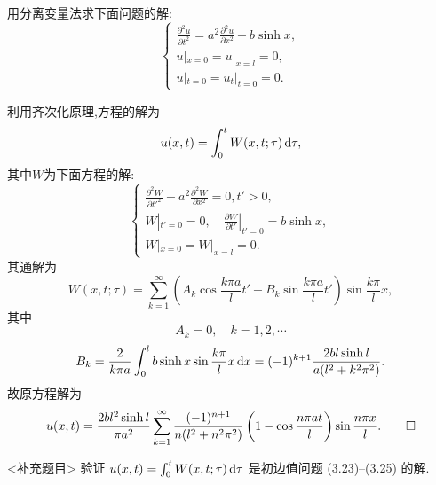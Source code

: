 \begin{exercise}
  用分离变量法求下面问题的解:
  \[\begin{cases}
    \frac{\partial^2u}{\partial t^2} = a^2 \frac{\partial^2u}{\partial x^2} + b\sinh x, \\
    u|_{x=0} = u|_{x=l} = 0, \\
    u|_{t=0} = u_t|_{t=0} = 0.
  \end{cases}\]
\end{exercise}

\begin{solve}
  利用齐次化原理,方程的解为
  \[u(x,t)=\int_0^tW(x,t;\tau)\mathop{}\!\mathrm{d}\tau,\]
  其中$W$为下面方程的解:
  \[\begin{cases}
    \frac{\partial^2W}{\partial t'^2}-a^2\frac{\partial^2W}{\partial x^2}=0,t'>0, \\
    W|_{t'=0} = 0,\quad\frac{\partial W}{\partial t'}|_{t'=0} = b\sinh x, \\
    W|_{x=0} = W|_{x=l} = 0.
  \end{cases}\]
  其通解为
  \[W(x,t;\tau) = \sum_{k=1}^{\infty}\left(A_k\cos\frac{k\pi a}{l}t'
    + B_k\sin\frac{k\pi a}{l}t'\right)\sin\frac{k\pi}{l}x,\]
  其中
  \[A_k = 0,\quad k=1,2,\cdots\]
  \[B_k = \frac{2}{k\pi a}\int_0^l b\sinh x\sin\frac{k\pi}{l}x\mathop{}\!\mathrm{d} x
    = (-1)^{k+1}\frac{2bl\sinh l}{a(l^2+k^2\pi^2)}.\]
  故原方程解为
  \[u(x,t)=\frac{2bl^2\sinh l}{\pi a^2}\sum_{k=1}^{\infty}\frac{(-1)^{n+1}}{n(l^2+n^2\pi^2)}\left(1-\cos\frac{n\pi at}{l}\right)\sin\frac{n\pi x}{l}.\qedhere\]
\end{solve}


\begin{exercise}[7]<补充题目>
  验证 $u(x,t) = \int_0^t W(x,t;\tau)\mathop{}\!\mathrm{d}\tau$ 是初边值问题 (3.23)--(3.25) 的解.
\end{exercise}

